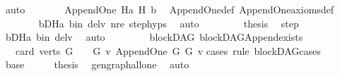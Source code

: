 \begin{isabellebody}
\ auto\isanewline
\ \ \ \ \isamarkupfalse%
\ \isamarkupfalse%
\ {\isachardoublequoteopen}Append{\isacharunderscore}{\kern0pt}One\ Ha\ H\ b{\isachardoublequoteclose}\ \isamarkupfalse%
\ Append{\isacharunderscore}{\kern0pt}One{\isacharunderscore}{\kern0pt}def\ Append{\isacharunderscore}{\kern0pt}One{\isacharunderscore}{\kern0pt}axioms{\isacharunderscore}{\kern0pt}def\ \isanewline
\ \ \ \ \ \ \isamarkupfalse%
\ bD{\isacharunderscore}{\kern0pt}Ha\ b{\isacharunderscore}{\kern0pt}in\ del{\isacharunderscore}{\kern0pt}v\ nre\ step{\isachardot}{\kern0pt}hyps{\isacharparenleft}{\kern0pt}{}{\isacharparenright}{\kern0pt}\ \isamarkupfalse%
\ auto\ \isanewline
\ \ \ \ \isamarkupfalse%
\ \isamarkupfalse%
\ {\isacharquery}{\kern0pt}thesis\ \isamarkupfalse%
\ step\isanewline
\ \ \ \ \ \ \isamarkupfalse%
\ bD{\isacharunderscore}{\kern0pt}Ha\ b{\isacharunderscore}{\kern0pt}in\ del{\isacharunderscore}{\kern0pt}v\ \isamarkupfalse%
\ auto\ \isanewline
\ \ \isamarkupfalse%
\ \ \isanewline
{}\isamarkupfalse%
%
\endisatagproof
{\isafoldproof}%
%
\isadelimproof
\isanewline
%
\endisadelimproof
\isanewline
{}\isamarkupfalse%
\ {\isacharparenleft}{\kern0pt}\ blockDAG{\isacharparenright}{\kern0pt}\ blockDAG{\isacharunderscore}{\kern0pt}Append{\isacharunderscore}{\kern0pt}exists{\isacharcolon}{\kern0pt}\isanewline
\ \ \ {\isachardoublequoteopen}card\ {\isacharparenleft}{\kern0pt}verts\ G{\isacharparenright}{\kern0pt}\ {\isacharequal}{\kern0pt}\ {}\ {\isasymor}\ {\isacharparenleft}{\kern0pt}{\isasymexists}G{}\ v{\isachardot}{\kern0pt}\ Append{\isacharunderscore}{\kern0pt}One\ G{}\ G\ v{\isacharparenright}{\kern0pt}{\isachardoublequoteclose}\isanewline
%
\isadelimproof
%
\endisadelimproof
%
\isatagproof
{}\isamarkupfalse%
{\isacharparenleft}{\kern0pt}cases\ rule{\isacharcolon}{\kern0pt}\ blockDAG{\isacharunderscore}{\kern0pt}cases{}{\isacharparenright}{\kern0pt}\isanewline
\ \ \isamarkupfalse%
\ base\isanewline
\ \ \isamarkupfalse%
\ \isamarkupfalse%
\ {\isacharquery}{\kern0pt}thesis\ \isamarkupfalse%
\ gen{\isacharunderscore}{\kern0pt}graph{\isacharunderscore}{\kern0pt}all{\isacharunderscore}{\kern0pt}one\ \isamarkupfalse%
\ auto\isanewline
{}\isamarkupfalse%
\isanewline

\end{isabellebody}

